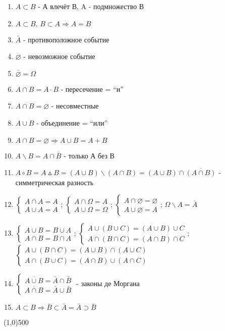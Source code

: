 \begin{enumerate}
\item $A \subset B$ - А влечёт В, A - подмножество В
\item $A\subset B,\,B\subset A \Rightarrow A=B$
\item $\bar{A}$ - противоположное событие
\item $\varnothing$ - невозможное событие
\item $\bar{\varnothing}=\Omega$
\item $A\cap B = A\cdot B$ - пересечение = ``и''
\item $A\cap B = \varnothing$ - несовместные
\item $A\cup B$ - объединение = ``или''
\item $A\cap B=\varnothing \Rightarrow A\cup B = A+B$
\item $A\backslash B = A\cap\bar{B}$ - только А без В
\item $A \circ B = A\vartriangle B = (A\cup B)\backslash(A\cap B)=(A\cup B)\cap\overline{(A\cap B)} $ - симметрическая разность
\item $\left\{\begin{array}{l}A\cap A=A\\ A\cup A=A\end{array}\right.$;
      $\left\{\begin{array}{l}A\cap \Omega=A\\ A\cup \Omega=\Omega\end{array}\right.$;
      $\left\{\begin{array}{l}A\cap \varnothing=\varnothing\\ A\cup \varnothing=A\end{array}\right.$;
      $ \Omega\backslash A=\bar{A} $
\item $\left\{\begin{array}{l} A\cup B = B\cup A\\A\cap B = B\cap A\end{array}\right.$;
      $\left\{\begin{array}{l} A\cup(B\cup C)=(A\cup B)\cup C \\ A\cap(B\cap C)=(A\cap B)\cap C \end{array}\right.$;
      $\left\{\begin{array}{l} A\cup(B\cap C)=(A\cup B)\cap(A\cup C)\\A\cap(B\cup C)=(A\cap B)\cup(A\cap C)\end{array}\right.$
\item $\left\{\begin{array}{l} \overline{A\cup B}=\bar{A}\cap\bar{B}\\\overline{A\cap B}=\bar{A}\cup\bar{B}\end{array}\right.$ - законы де Моргана
\item $A\subset B\Rightarrow\bar{B}\subset\bar{A}=\bar{A}\supset\bar{B}$
\end{enumerate}
\line(1,0){500}
\vfill \hfill {}

